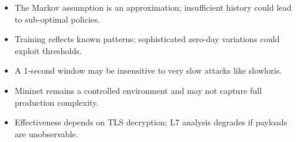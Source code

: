 \documentclass[12pt,a4paper]{report}
\begin{document}
\begin{itemize}
    \item The Markov assumption is an approximation; insufficient history could lead to sub-optimal policies.
    \item Training reflects known patterns; sophisticated zero-day variations could exploit thresholds.
    \item A 1-second window may be insensitive to very slow attacks like slowloris.
    \item Mininet remains a controlled environment and may not capture full production complexity.
    \item Effectiveness depends on TLS decryption; L7 analysis degrades if payloads are unobservable.
\end{itemize}



\end{document}
